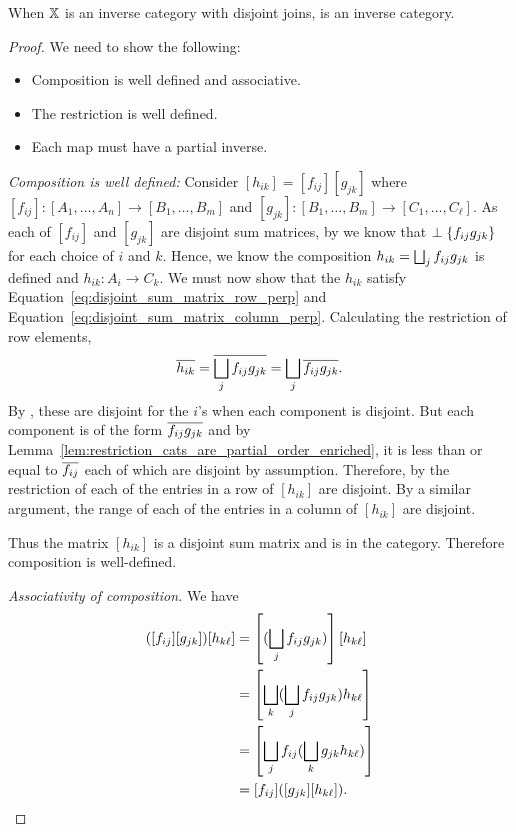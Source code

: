 \begin{lemma}\label{lem:inverse_matrix_category_is_a_restriction_category}
  When $\mathbb{X}$ is an inverse category with disjoint joins, \imatx is an inverse category.
\end{lemma}
\begin{proof}
  We need to show the following:
  \begin{itemize}
    \item Composition is well defined and associative.
    \item The restriction is well defined.
    \item Each map must have a partial inverse.
  \end{itemize}

  \emph{Composition is well defined:} Consider $[h_{i k}] = [f_{i j}] [g_{j k}]$ where $[f_{i j}]:
  [A_1,\ldots, A_n] \to [B_1,\ldots, B_m]$ and $[g_{j k}]: [B_1,\ldots, B_m] \to [C_1,\ldots,
  C_\ell]$. As each of $ [f_{i j}]$ and $ [g_{j k}]$ are disjoint sum matrices, by  we know that
  $\perp \{f_{i j} g_{j k}\}$ for each choice of $i$ and $k$. Hence, we know the composition
  $h_{i k} = \bigsqcup_j f_{i j} g_{j k}$ is defined and $h_{i k}:A_i\to C_{k}$. We must
  now show that the $h_{ik}$ satisfy Equation~\ref{eq:disjoint_sum_matrix_row_perp} and
  Equation~\ref{eq:disjoint_sum_matrix_column_perp}. Calculating the restriction of row elements,
  \[
    \overline{h_{ik}} = \overline{ \bigsqcup_j f_{i j} g_{j k}} = \bigsqcup_j \overline{ f_{i j}
      g_{j k}}.
  \]
  By , these are disjoint for the $i$'s when each component is disjoint. But each
  component is of the form $\overline{f_{ij}g_{j k}}$ and by
  Lemma~\ref{lem:restriction_cats_are_partial_order_enriched}, it is less than or equal to
  $\overline{f_{ij}}$ each of which are disjoint by assumption. Therefore, by  the
  restriction of each of the entries in a row of $[h_{i k}]$ are disjoint. By a similar argument,
  the range of each of the entries in a column of $[h_{i k}]$ are disjoint.

  Thus the matrix $[h_{i k}]$ is a disjoint sum matrix and is in the category. Therefore
  composition is well-defined.

  \emph{Associativity of composition.} We have
  \begin{align*}
    ([f_{i j}] [g_{j k}]) [h_{k \ell}]
        &= \left[(\bigsqcup_j f_{i j}  g_{j k})\right] [h_{k \ell}]\\
        &=\left[ \bigsqcup_k (\bigsqcup_j f_{i j} g_{j k}) h_{k \ell}\right]\\
        &=\left[ \bigsqcup_j f_{i j}  (\bigsqcup_k g_{j k} h_{k \ell})\right]\\
        &=[ f_{i j} ]  ([g_{j k}] [h_{k \ell}]).
  \end{align*}


\end{proof}
